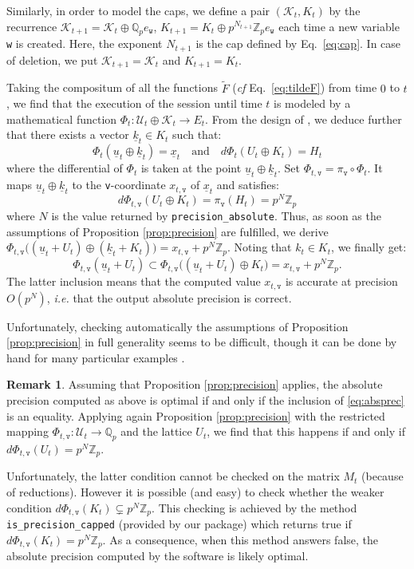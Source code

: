 \documentclass[sigconf]{acmart}
\newcommand{\Z}{\mathbb Z}
\newcommand{\Zp}{\Z_p}
\newcommand{\Q}{\mathbb Q}
\newcommand{\Qp}{\Q_p}
\newcommand{\ttv}{\texttt{v}\xspace}
\newcommand{\ttw}{\texttt{w}\xspace}
\newcommand{\calU}{\mathcal{U}}
\newcommand{\calK}{\mathcal{K}}
\newcommand{\ZpLC}{\text{\rm \tt ZpLC}\xspace}
\theoremstyle{definition}
\newtheorem{rmk}[theo]{Remark}
\begin{document}
Similarly, in order to model the caps, we define a pair $(\calK_t, 
K_t)$ by the recurrence $\calK_{t+1} = \calK_t \oplus \Qp e_\ttw$,
$K_{t+1} = K_t \oplus p^{N_{t+1}} \Zp e_\ttw$
each time a new variable \ttw is created. 
Here, the exponent $N_{t+1}$ is the cap defined by Eq.~\eqref{eq:cap}.
In case of deletion, we put $\calK_{t+1} = \calK_t$ and $K_{t+1} = K_t$.

Taking the compositum of all the functions $\tilde F$ (\emph{cf} 
Eq.~\eqref{eq:tildeF}) from time $0$ to $t$, we find that the execution 
of the session until time $t$ is modeled by a mathematical function
$\Phi_t : \calU_t \oplus \calK_t \to E_t$.
From the design of \ZpLC, we deduce further that there exists a 
vector $\underline k_t \in K_t$ such that:
$$\Phi_t(\underline u_t \oplus \underline k_t) = \underline x_t 
\quad \text{and} \quad
d\Phi_t (U_t \oplus K_t) = H_t$$
where the differential of $\Phi_t$ is taken at the point
$\underline u_t \oplus \underline k_t$. 
Set $\Phi_{t,\ttv} = \pi_\ttv \circ \Phi_t$. It maps 
$\underline u_t \oplus \underline k_t$ to the \ttv-coordinate 
$x_{t,\ttv}$ of $\underline x_t$ and satisfies:
$$d\Phi_{t,\ttv} (U_t \oplus K_t) = \pi_\ttv(H_t) = p^N \Zp$$
where $N$ is the value returned by \verb?precision_absolute?. Thus, 
as soon as the assumptions of Proposition \ref{prop:precision} are
fulfilled, we derive
$\Phi_{t,\ttv} \big((\underline u_t + U_t) \oplus (\underline k_t + K_t)\big) = 
x_{t,\ttv} + p^N \Zp$.
Noting that $k_t \in K_t$, we finally get:
\begin{equation}
\label{eq:absprec}
\Phi_{t,\ttv} (\underline u_t + U_t) \subset
\Phi_{t,\ttv} \big((\underline u_t + U_t) \oplus K_t\big) = 
x_{t,\ttv} + p^N \Zp.
\end{equation}
The latter inclusion means that the computed value $x_{t,\ttv}$ is
accurate at precision $O(p^N)$, \emph{i.e.} that the output absolute
precision is correct. 

Unfortunately, checking automatically the assumptions of Proposition 
\ref{prop:precision} in full generality seems to be difficult, though it 
can be done by hand for many particular examples \cite{}.

\begin{rmk}
Assuming that Proposition \ref{prop:precision} applies, 
the absolute precision computed as above is optimal if and only if
the inclusion of \eqref{eq:absprec} is an equality. Applying again
Proposition \ref{prop:precision}
with the restricted mapping $\Phi_{t,\ttv} : \calU_t \to \Qp$ and the
lattice $U_t$, we find that this happens if and only if
$d\Phi_{t,\ttv}(U_t) = p^N \Zp$.

Unfortunately, the latter condition cannot be checked on the matrix 
$M_t$ (because of reductions). 
However it is possible (and easy) to check whether the weaker condition 
$d\Phi_{t,\ttv}(K_t) \subsetneq p^N \Zp$. This checking is achieved by 
the method
\verb?is_precision_capped? (provided by our package) which returns true 
if $d\Phi_{t,\ttv}(K_t) = p^N \Zp$. As a consequence, when this method
answers false, the absolute precision computed by the software is
likely optimal.
\end{rmk}
\end{document}
